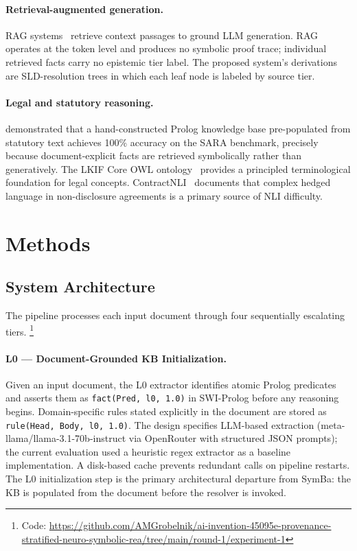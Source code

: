 \documentclass[11pt,letterpaper]{article}
\begin{document}
\paragraph{Retrieval-augmented generation.}
RAG systems~\citep{Lewis2020} retrieve context passages to ground LLM generation.
RAG operates at the token level and produces no symbolic proof trace; individual retrieved facts carry no epistemic tier
label. The proposed system's derivations are SLD-resolution trees in which each leaf node is labeled by source tier.

\paragraph{Legal and statutory reasoning.}
\citet{Holzenberger2023} demonstrated that a hand-constructed Prolog knowledge base
pre-populated from statutory text achieves 100\% accuracy on the SARA benchmark, precisely because document-explicit facts
are retrieved symbolically rather than generatively. The LKIF Core OWL ontology~\citep{Hoekstra2007} provides a principled terminological
foundation for legal concepts. ContractNLI~\citep{Koreeda2021} documents that complex hedged language in non-disclosure agreements is
a primary source of NLI difficulty.

\section{Methods}
\label{sec:methods}

\subsection{System Architecture}

The pipeline processes each input document through four sequentially escalating tiers.
\footnote{Code: \url{https://github.com/AMGrobelnik/ai-invention-45095e-provenance-stratified-neuro-symbolic-rea/tree/main/round-1/experiment-1}}

\paragraph{L0 --- Document-Grounded KB Initialization.}
Given an input document, the L0 extractor identifies atomic Prolog predicates
and asserts them as \texttt{fact(Pred, l0, 1.0)} in SWI-Prolog before any reasoning begins. Domain-specific rules stated explicitly
in the document are stored as \texttt{rule(Head, Body, l0, 1.0)}. The design specifies LLM-based extraction (meta-llama/llama-3.1-70b-instruct
via OpenRouter with structured JSON prompts); the current evaluation used a heuristic regex extractor as a baseline implementation.
A disk-based cache prevents redundant calls on pipeline restarts. The L0 initialization step is the primary architectural
departure from SymBa: the KB is populated from the document before the resolver is invoked.
\end{document}
